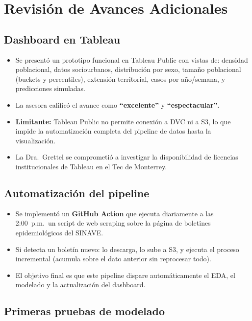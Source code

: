 \documentclass[11pt, a4paper]{article}
\begin{document}
\section{Revisión de Avances Adicionales}

\subsection{Dashboard en Tableau}

\begin{itemize}[leftmargin=1.5em]
    \item Se presentó un prototipo funcional en Tableau Public con vistas de:
        densidad poblacional, datos sociourbanos, distribución por sexo, tamaño poblacional (buckets y percentiles), extensión territorial, casos por año/semana, y predicciones simuladas.
    \item La asesora calificó el avance como \textbf{``excelente''} y \textbf{``espectacular''}.
    \item \textbf{Limitante:} Tableau Public no permite conexión a DVC ni a S3, lo que impide la automatización completa del pipeline de datos hasta la visualización.
    \item La Dra.\ Grettel se comprometió a investigar la disponibilidad de licencias institucionales de Tableau en el Tec de Monterrey.
\end{itemize}

\subsection{Automatización del pipeline}

\begin{itemize}[leftmargin=1.5em]
    \item Se implementó un \textbf{GitHub Action} que ejecuta diariamente a las 2:00~p.m.\ un script de web scraping sobre la página de boletines epidemiológicos del SINAVE.
    \item Si detecta un boletín nuevo: lo descarga, lo sube a S3, y ejecuta el proceso incremental (acumula sobre el dato anterior sin reprocesar todo).
    \item El objetivo final es que este pipeline dispare automáticamente el EDA, el modelado y la actualización del dashboard.
\end{itemize}

\subsection{Primeras pruebas de modelado}
\end{document}
